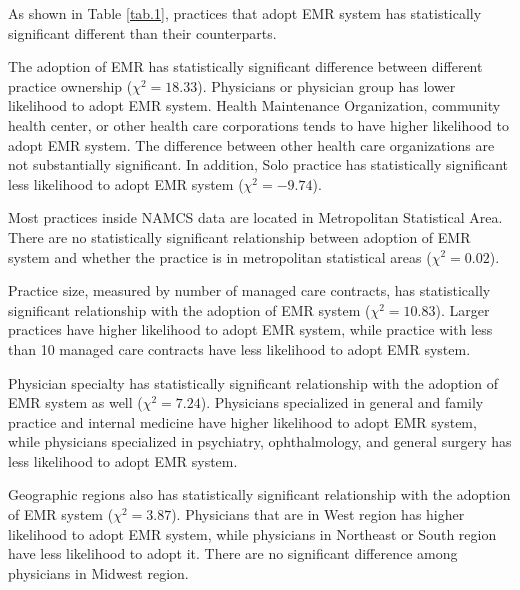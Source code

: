 As shown in Table \ref{tab.1}, practices that adopt EMR system has statistically significant different than their counterparts.

The adoption of EMR has statistically significant difference between different practice ownership ($\chi^2=18.33$). Physicians or physician group has lower likelihood to adopt EMR system. Health Maintenance Organization, community health center, or other health care corporations tends to have higher likelihood to adopt EMR system. The difference between other health care organizations are not substantially significant. In addition, Solo practice has statistically significant less likelihood to adopt EMR system ($\chi^2=-9.74$).

Most practices inside NAMCS data are located in Metropolitan Statistical Area. There are no statistically significant relationship between adoption of EMR system and whether the practice is in metropolitan statistical areas ($\chi^2=0.02$).

Practice size, measured by number of managed care contracts, has statistically significant relationship with the adoption of EMR system ($\chi^2=10.83$). Larger practices have higher likelihood to adopt EMR system, while practice with less than 10 managed care contracts have less likelihood to adopt EMR system.

Physician specialty has statistically significant relationship with the adoption of EMR system as well ($\chi^2=7.24$). Physicians specialized in general and family practice and internal medicine have higher likelihood to adopt EMR system, while physicians specialized in psychiatry, ophthalmology, and general surgery has less likelihood to adopt EMR system.

Geographic regions also has statistically significant relationship with the adoption of EMR system ($\chi^2=3.87$). Physicians that are in West region has higher likelihood to adopt EMR system, while physicians in Northeast or South region have less likelihood to adopt it. There are no significant difference among physicians in Midwest region.
